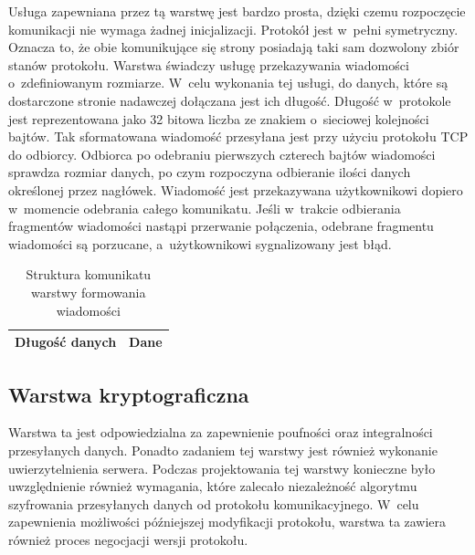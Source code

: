 Usługa zapewniana przez tą warstwę jest bardzo prosta, dzięki czemu
rozpoczęcie komunikacji nie wymaga żadnej inicjalizacji. Protokół jest
w~pełni symetryczny. Oznacza to, że obie komunikujące się strony
posiadają taki sam dozwolony zbiór stanów protokołu. Warstwa świadczy
usługę przekazywania wiadomości o~zdefiniowanym rozmiarze. W~celu
wykonania tej usługi, do danych, które są dostarczone stronie
nadawczej dołączana jest ich długość. Długość w~protokole jest
reprezentowana jako 32 bitowa liczba ze znakiem o~sieciowej kolejności
bajtów. Tak sformatowana wiadomość przesyłana jest przy użyciu
protokołu TCP do odbiorcy. Odbiorca po odebraniu pierwszych czterech
bajtów wiadomości sprawdza rozmiar danych, po czym rozpoczyna
odbieranie ilości danych określonej przez nagłówek. Wiadomość jest
przekazywana użytkownikowi dopiero w~momencie odebrania całego
komunikatu. Jeśli w~trakcie odbierania fragmentów wiadomości nastąpi
przerwanie połączenia, odebrane fragmentu wiadomości są porzucane,
a~użytkownikowi sygnalizowany jest błąd.

\begin{table}[H]
\centering
\caption{Struktura komunikatu warstwy formowania wiadomości}

\begin{tabular}{|p{3cm}|p{6cm}|}
\hline
Długość danych & Dane\\
\hline
\end{tabular}
\end{table}


\subsection[Warstwa kryptograficzna][Warstwa kryptograficzna]{Warstwa kryptograficzna}

Warstwa ta jest odpowiedzialna za zapewnienie poufności oraz
integralności przesyłanych danych. Ponadto zadaniem tej warstwy jest
również wykonanie uwierzytelnienia serwera. Podczas projektowania tej
warstwy konieczne było uwzględnienie również wymagania, które zalecało
niezależność algorytmu szyfrowania przesyłanych danych od protokołu
komunikacyjnego. W~celu zapewnienia możliwości późniejszej modyfikacji
protokołu, warstwa ta zawiera również proces negocjacji wersji
protokołu.

